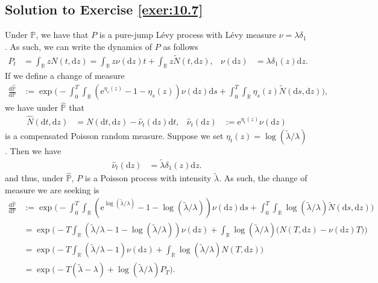 \documentclass[12pt]{book}
\numberwithin{equation}{chapter}
\theoremstyle{plain}
\numberwithin{theorem}{section}
\theoremstyle{definition}
\numberwithin{exercise}{chapter}
\newcommand{\<}{\langle}
\renewcommand{\>}{\rangle}
\renewcommand{\(}{\left(}
\renewcommand{\)}{\right)}
\renewcommand{\[}{\left[}
\renewcommand{\]}{\right]}
\newcommand\Pb{\mathds{P}}
\newcommand\Rb{\mathds{R}}
\newcommand\lam{\lambda}
\newcommand\del{\delta}
\newcommand\Pbh{\widehat{\Pb}}
\newcommand\Nh{\widehat{N}}
\newcommand\nuh{\widehat{\nu}}
\newcommand\Nt{\widetilde{N}}
\newcommand\dd{\mathrm{d}}
\newcommand\ee{\mathrm{e}}
\begin{document}
\subsection*{Solution to Exercise \ref{exer:10.7}}
Under $\Pb$, we have that $P$ is a pure-jump L\'evy process with L\'evy measure $\nu = \lam \del_1$. 
As such, we can write the dynamics of $P$ as follows
\begin{align}
P_t
	&=	\int_\Rb z N( t, \dd z) 
	=		\int_\Rb z \nu(\dd z) t  + \int_\Rb z \Nt(t , \dd z) , &
\nu(\dd z)
	&=	\lam \del_1(z) \dd z .
\end{align}
If we define a change of measure
\begin{align}
\frac{\dd \Pbh}{\dd \Pb}
	&:=	\exp \Big( - \int_0^T \int_\Rb \( \ee^{\eta_s(z)} - 1 - \eta_s(z) \) \nu(\dd z) \dd s + \int_0^T \int_\Rb \eta_s(z) \Nt(\dd s , \dd z) \Big) ,
\end{align}
we have under $\Pbh$ that
\begin{align}
\Nh(\dd t, \dd z)
	&=	N(\dd t, \dd z) - \nuh_t(\dd z) \dd t , &
\nuh_t(\dd z)
	&:=	\ee^{\eta_t(z)} \nu(\dd z) 
\end{align}
is a compensated Poisson random measure.  Suppose we set $\eta_t(z) = \log ( \widetilde{\lam} / \lam )$.  Then we have
\begin{align}
\nuh_t(\dd z)
	&= \widetilde{\lam} \del_1(z) \dd z .
\end{align}
and thus, under $\Pbh$, $P$ is a Poisson process with intensity $\widetilde{\lam}$.  As such, the change of measure we are seeking is
\begin{align}
\frac{\dd \Pbh}{\dd \Pb}
	&:=	\exp \Big( - \int_0^T \int_\Rb \( \ee^{\log ( \widetilde{\lam} / \lam )} - 1 - \log ( \widetilde{\lam} / \lam )  \) \nu(\dd z) \dd s + \int_0^T \int_\Rb \log ( \widetilde{\lam} / \lam ) \Nt(\dd s , \dd z) \Big) \\
	&=	\exp \Big( - T \int_\Rb \( \widetilde{\lam} / \lam - 1 - \log ( \widetilde{\lam} / \lam )  \) \nu(\dd z)  + \int_\Rb \log ( \widetilde{\lam} / \lam ) \Big( N(T , \dd z) - \nu(\dd z) T  \Big) \Big) \\
	&=	\exp \Big( - T \int_\Rb \( \widetilde{\lam} / \lam - 1 \) \nu(\dd z)  + \int_\Rb \log ( \widetilde{\lam} / \lam ) N(T , \dd z) \Big)	\\
	&=	\exp \Big( - T  \( \widetilde{\lam} -  \lam \) + \log ( \widetilde{\lam} / \lam ) P_T \Big)	 .
\end{align}
\end{document}
